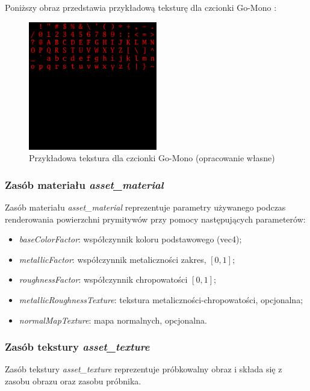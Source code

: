 Poniższy obraz przedstawia przykładową teksturę dla czcionki Go-Mono \cite{GOMONOFONT}:
\begin{figure}[htbp]
	\centering
	\includegraphics[width=0.5\textwidth]{images/font_texture.png}
	\caption{Przykładowa tekstura dla czcionki Go-Mono \cite{GOMONOFONT} (opracowanie własne)}
	\label{font_texture}
\end{figure}

\subsubsection{Zasób materiału \textit{asset\_material}}
Zasób materiału \textit{asset\_material} reprezentuje parametry używanego podczas renderowania powierzchni
prymitywów przy pomocy następujących parameterów:
\begin{itemize}
	\item \textit{baseColorFactor}: współczynnik koloru podstawowego (vec4);
	\item \textit{metallicFactor}: współczynnik metaliczności zakres, $\left[0,1\right]$;
	\item \textit{roughnessFactor}: współczynnik chropowatości $\left[0,1\right]$;
	\item \textit{metallicRoughnessTexture}: tekstura metaliczności-chropowatości, opcjonalna;
	\item \textit{normalMapTexture}: mapa normalnych, opcjonalna.
\end{itemize}

\subsubsection{Zasób tekstury \textit{asset\_texture}}
Zasób tekstury \textit{asset\_texture} reprezentuje próbkowalny obraz i składa się z zasobu obrazu oraz zasobu próbnika.

